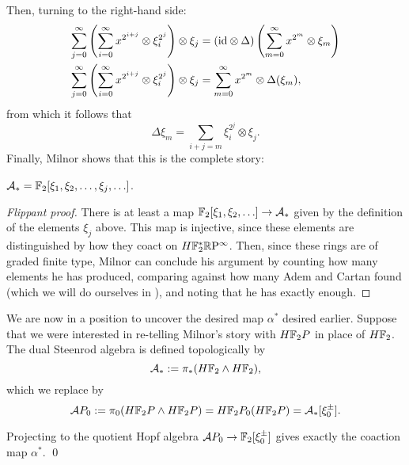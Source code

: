 Then, turning to the right-hand side:
\begin{align*}
\sum_{j=0}^\infty \left( \sum_{i=0}^\infty x^{2^{i+j}} \otimes \xi_i^{2^j} \right) \otimes \xi_j & = (\mathrm{id} \otimes \Delta) \left( \sum_{m=0}^\infty x^{2^m} \otimes \xi_m \right) \\
\sum_{j=0}^\infty \left( \sum_{i=0}^\infty x^{2^{i+j}} \otimes \xi_i^{2^j} \right) \otimes \xi_j & = \sum_{m=0}^\infty x^{2^m} \otimes \Delta(\xi_m),
\end{align*}
from which it follows that \[\Delta \xi_m = \sum_{i+j=m} \xi_i^{2^j} \otimes \xi_j.\]  Finally, Milnor shows that this is the complete story:
\begin{theorem}[Milnor]
$\mathcal A_* = \mathbb F_2[\xi_1, \xi_2, \ldots, \xi_j, \ldots]$.
\end{theorem}
\begin{proof}[Flippant proof]
There is at least a map $\mathbb F_2[\xi_1, \xi_2, \ldots] \to \mathcal A_*$ given by the definition of the elements $\xi_j$ above.  This map is injective, since these elements are distinguished by how they coact on $H\mathbb F_2^* \mathbb R\mathrm P^\infty$.  Then, since these rings are of graded finite type, Milnor can conclude his argument by counting how many elements he has produced, comparing against how many Adem and Cartan found (which we will do ourselves in ), and noting that he has exactly enough.
\end{proof}

We are now in a position to uncover the desired map $\alpha^*$ desired earlier.  Suppose that we were interested in re-telling Milnor's story with $H\mathbb F_2P$ in place of $H\mathbb F_2$.  The dual Steenrod algebra is defined topologically by \[\mathcal A_* := \pi_*(H\mathbb F_2 \wedge H\mathbb F_2),\] which we replace by \[\mathcal AP_0 := \pi_0 (H\mathbb F_2 P \wedge H\mathbb F_2 P) = H\mathbb F_2P_0(H\mathbb F_2 P) = \mathcal A_*[\xi_0^\pm].\]

\begin{lemma}
Projecting to the quotient Hopf algebra $\mathcal AP_0 \to \mathbb F_2[\xi_0^\pm]$ gives exactly the coaction map $\alpha^*$. \qed
\end{lemma}

